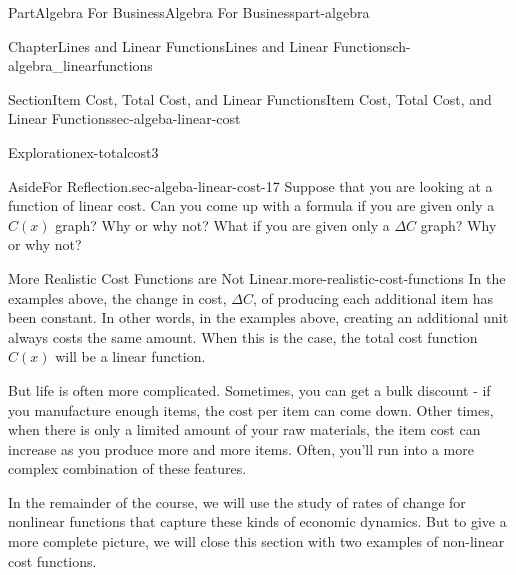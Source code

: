 \documentclass[oneside,10pt,]{tufte-book}
\numberwithin{equation}{chapter}
\def \tikzhistogram (#1,#2){\draw[fill=blue,opacity=0.3] ({#1+((\xtwo-\xmin)/5)},#2) rectangle ({#1-((\xtwo-\xmin)/5)},0); \draw[draw,thick] ({#1+((\xtwo-\xmin)/5)},#2) rectangle ({#1-((\xtwo-\xmin)/5)},0); \node[draw,fill=blue, circle,inner sep=2.5pt] at (#1,#2) {};}
\begin{document}
\begin{partptx}{Part}{Algebra For Business}{}{Algebra For Business}{}{}{part-algebra}
\begin{chapterptx}{Chapter}{Lines and Linear Functions}{}{Lines and Linear Functions}{}{}{ch-algebra_linearfunctions}
\begin{sectionptx}{Section}{Item Cost, Total Cost, and Linear Functions}{}{Item Cost, Total Cost, and Linear Functions}{}{}{sec-algeba-linear-cost}
\begin{exploration}{Exploration}{}{ex-totalcost3}
\begin{enumerate}[font=\bfseries,label=(\alph*),ref=\alph*]
\begin{image}{0}{1}{0}{}
{
}%
\end{image}%
\end{enumerate}%
\end{exploration}%
\begin{aside}{Aside}{For Reflection.}{sec-algeba-linear-cost-17}%
Suppose that you are looking at a function of linear cost.  Can you come up with a formula if you are given only a \(C(x)\) graph? Why or why not? What if you are given only a \(\Delta C\) graph? Why or why not?%
\end{aside}
\begin{paragraphs}{More Realistic Cost Functions are Not Linear.}{more-realistic-cost-functions}%
In the examples above, the change in cost, \(\Delta C\), of producing each additional item has been constant. In other words, in the examples above, creating an additional unit always costs the same amount. When this is the case, the total cost function \(C(x)\) will be a linear function.%
\par
But life is often more complicated. Sometimes, you can get a bulk discount - if you manufacture enough items, the cost per item can come down. Other times, when there is only a limited amount of your raw materials, the item cost can increase as you produce more and more items. Often, you'll run into a more complex combination of these features.%
\par
In the remainder of the course, we will use the study of rates of change for nonlinear functions that capture these kinds of economic dynamics. But to give a more complete picture, we will close this section with two examples of non-linear cost functions.%

\end{paragraphs}
\end{sectionptx}
\end{chapterptx}
\end{partptx}
\end{document}
